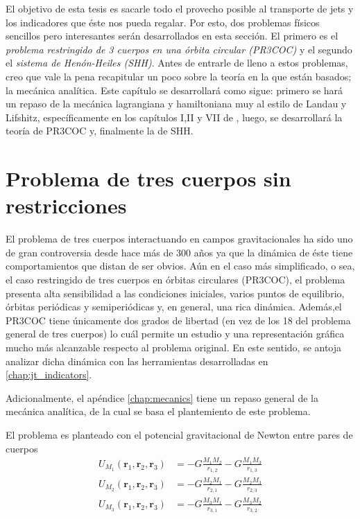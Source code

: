 
El objetivo de esta tesis es sacarle todo el provecho posible al transporte de jets y los indicadores que éste nos pueda regalar. Por esto, dos problemas físicos sencillos pero interesantes serán desarrollados en esta sección. El primero es el \textit{problema restringido de 3 cuerpos en una órbita circular (PR3COC)} y el segundo el \textit{sistema de Henón-Heiles (SHH)}. Antes de entrarle de lleno a estos problemas, creo que vale la pena recapitular un poco sobre la teoría en la que están basados; la mecánica analítica. Este capítulo se desarrollará como sigue: primero se hará un repaso de la mecánica lagrangiana y hamiltoniana muy al estilo de Landau y Lifshitz, específicamente en los capítulos I,II y VII de \cite{mechanics_landau_lifshitz}, luego, se desarrollará la teoría de PR3COC y, finalmente la de SHH.

\section{Problema de tres cuerpos sin restricciones}
\label{sec:3BP}

El problema de tres cuerpos interactuando en campos gravitacionales ha sido uno de gran controversia desde hace más de 300 años ya que la dinámica de éste tiene comportamientos que distan de ser obvios. Aún en el caso más simplificado, o sea, el caso restringido de tres cuerpos en órbitas circulares (PR3COC), el problema presenta alta sensibilidad a las condiciones iniciales, varios puntos de equilibrio, órbitas periódicas y semiperiódicas y, en general, una rica dinámica. Además,el PR3COC tiene únicamente dos grados de libertad (en vez de los 18 del problema general de tres cuerpos) lo cuál permite un estudio y una representación gráfica mucho más alcanzable respecto al problema original. En este sentido, se antoja analizar dicha dinámica con las herramientas desarrolladas en \ref{chap:jt_indicators}.

Adicionalmente, el apéndice \ref{chap:mecanics} tiene un repaso general de la mecánica analítica, de la cual se basa el plantemiento de este problema. 

El problema es planteado con el potencial gravitacional de Newton entre pares de cuerpos 
\begin{align}
 U_{M_1}(\mathbf{r}_1,\mathbf{r}_2,\mathbf{r}_3) &= -G \frac{M_1 M_2}{r_{1,2}} - G \frac{M_1 M_3}{r_{1,3}} \\
 U_{M_2}(\mathbf{r}_1,\mathbf{r}_2,\mathbf{r}_3) &= -G \frac{M_2 M_1}{r_{2,1}} - G \frac{M_2 M_3}{r_{2,3}} \\
 U_{M_3}(\mathbf{r}_1,\mathbf{r}_2,\mathbf{r}_3) &= -G \frac{M_3 M_1}{r_{3,1}} - G \frac{M_3 M_2}{r_{3,2}}
 \label{eq:3body_potential}
\end{align}

